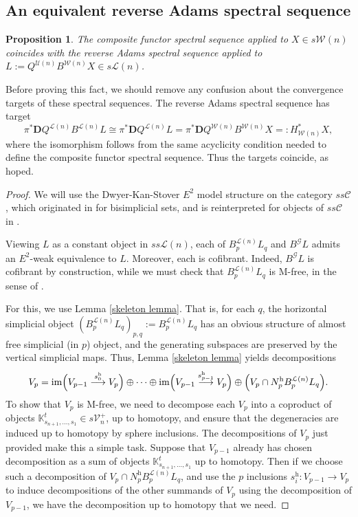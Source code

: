 \documentclass[11pt]{amsart} \renewcommand{\baselinestretch}{1.4}
\theoremstyle{plain}
\newtheorem{prop}[thm]{Proposition}
\theoremstyle{definition}
\DeclareMathOperator{\im}{im}
\renewcommand{\to}{\longrightarrow}
\newcommand{\scrG}{\mathscr{G}}
\newcommand{\calU}{\mathcal{U}}
\newcommand{\calL}{\mathcal{L}}
\newcommand{\calV}{\mathcal{V}}
\newcommand{\calw}{\mathcal{W}}
\newcommand{\calc}{\mathcal{C}}
\newcommand{\citeBOX}[2][]{\cite[\mbox{#1}]{#2}}
\newcommand{\vect}[2]{\calV^{#1}_{#2}}
\newcommand{\BSW}{{\scrG}}
\newcommand{\uhor}{^\mathrm{h}}
\newcommand{\dual}{\mathbf{D}}
\begin{document}
\begin{Composite functor spectral sequences}
\subsection{An equivalent reverse Adams spectral sequence}
\begin{prop}
The composite functor spectral sequence applied to $X\in s\calw(n)$ coincides with the reverse Adams spectral sequence applied to  $L:=Q^{\calU(n)}{ B^{\calw(n)}X}\in s\calL(n)$.
\end{prop}
\noindent Before proving this fact, we should remove any confusion about the convergence targets of these spectral sequences. The reverse Adams  spectral sequence has target
\[\pi^*\dual Q^{\calL(n)}B^{\calL(n)}L\cong \pi^*\dual Q^{\calL(n)}L=\pi^*\dual Q^{\calw(n)}B^{\calw(n)}X=:H^*_{\calw(n)}X,\]
where the isomorphism follows from the same acyclicity condition needed to define the composite functor spectral sequence. Thus the targets coincide, as hoped.
\begin{proof}
We will use the Dwyer-Kan-Stover $E^2$ model structure on the category $ss\calc$, which originated in \cite{DKS.pdf} for bisimplicial sets, and is reinterpreted for objects of $ss\calc$ in \citeBOX[\S4.1.1]{Blanc_Stover-Groth_SS.pdf}.

Viewing $L$ as a constant object in $ss\calL(n)$, each of $B^{\calL(n)}_pL_q$ and $B^{\BSW}L$ admits an $E^2$-weak equivalence to $L$. Moreover, each  is cofibrant. Indeed, $B^{\BSW}L$ is cofibrant by construction, while we must check  that  $B^{\calL(n)}_pL_q$ is M-free, in the sense of \citeBOX[\S4.1.1]{Blanc_Stover-Groth_SS.pdf}.

For this, we use Lemma \ref{skeleton lemma}. That is, for each $q$, the horizontal simplicial object $(B^{\calL(n)}_pL_q)_{p,q}:=B^{\calL(n)}_pL_q$ has an obvious structure of almost free simplicial (in $p$) object, and the generating subspaces are preserved by the vertical simplicial maps. Thus, Lemma \ref{skeleton lemma} yields decompositions
\[V_p=\im\Bigl(V_{p-1}\overset{s\uhor_0}{\to}V_p\Bigr)\oplus\cdots \oplus \im\Bigl(V_{p-1}\overset{s\uhor_{p-1}}{\to}V_p\Bigr)\oplus \Bigl(V_p\cap N\uhor_pB^{\calL(n)}_pL_q\Bigr).\]
To show that $V_p$ is M-free, we need to decompose each $V_p$ into a coproduct of objects $\mathbb{K}_{s_{n+1},\ldots,s_1}^t\in s\vect{+}{n}$, up to homotopy, and ensure that the degeneracies are induced up to homotopy by sphere inclusions. The decompositions of $V_p$ just provided make this a simple task.
Suppose that $V_{p-1}$ already has chosen decomposition as a sum of objects $\mathbb{K}_{s_{n+1},\ldots,s_1}^t$ up to homotopy. Then if we choose such a decomposition of $V_p\cap N\uhor_p B^{\calL(n)}_pL_q$, and use the $p$ inclusions $s\uhor_i:V_{p-1}\to V_p$ to induce decompositions of the other summands of $V_p$ using the decomposition of $V_{p-1}$, we have the decomposition up to homotopy that we need.


\end{proof}
\end{Composite functor spectral sequences}
\end{document}

